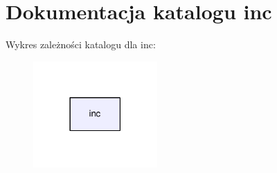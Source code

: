 \section{Dokumentacja katalogu inc}
\label{dir_bfccd401955b95cf8c75461437045ac0}
Wykres zależności katalogu dla inc\+:
\nopagebreak
\begin{figure}[H]
\begin{center}
\leavevmode
\includegraphics[width=134pt]{dir_bfccd401955b95cf8c75461437045ac0_dep}
\end{center}
\end{figure}
